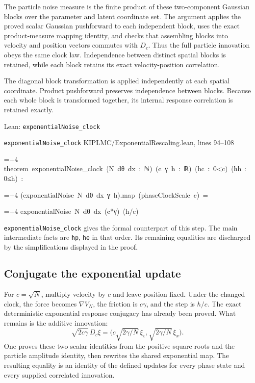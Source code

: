 \documentclass[11pt,a4paper]{report}
\newlength{\leancharwidth}
\newenvironment{leancode}{\par\smallskip\begingroup\ttfamily\footnotesize\raggedright
  \settowidth{\leancharwidth}{M}\setlength{\parskip}{0pt}\setlength{\parindent}{0pt}
  \frenchspacing}{\par\endgroup\smallskip}
\newcommand{\leanline}[2]{\hangindent=\dimexpr#1\leancharwidth+4\leancharwidth\relax
  \hangafter=1\noindent\hspace*{#1\leancharwidth}#2\par}
\newcommand{\leansource}[1]{\par{\footnotesize\color{leanmuted}#1}\par}
\newcommand{\leanlabel}[1]{\par\smallskip\noindent{\small\bfseries #1}\par}
\begin{document}
The particle noise measure is the finite product of these two-component Gaussian blocks over the parameter and latent coordinate set. The argument applies the proved scalar Gaussian pushforward to each independent block, uses the exact product-measure mapping identity, and checks that assembling blocks into velocity and position vectors commutes with \(D_c\). Thus the full particle innovation obeys the same clock law. Independence between distinct spatial blocks is retained, while each block retains its exact velocity-position correlation.



The diagonal block transformation is applied independently at each spatial coordinate. Product pushforward preserves independence between blocks. Because each whole block is transformed together, its internal response correlation is retained exactly.

\begin{leanbox}{Lean: \texttt{exponentialNoise\_\allowbreak{}clock}}
\leansource{\texttt{exponentialNoise\_\allowbreak{}clock} \quad KIPLMC/\allowbreak{}ExponentialRescaling.lean, lines 94–108}
\begin{leancode}
\leanline{0}{theorem\ exponentialNoise\_clock\ (N\ dθ\ dx\ :\ ℕ)\ (c\ γ\ h\ :\ ℝ)\ (hc\ :\ 0<c)\ (hh\ :\ 0≤h)\ :}
\leanline{4}{(exponentialNoise\ N\ dθ\ dx\ γ\ h).map\ (phaseClockScale\ c)\ =}
\leanline{6}{exponentialNoise\ N\ dθ\ dx\ (c*γ)\ (h/c)}
\end{leancode}
\leanlabel{How the Lean proof follows the argument}
\texttt{exponential\allowbreak{}Noise\_\allowbreak{}clock} gives the formal counterpart of this step. The main intermediate facts are \texttt{hp}, \texttt{he} in that order. Its remaining equalities are discharged by the simplifications displayed in the proof.
\end{leanbox}
\subsection{\texorpdfstring{Conjugate the exponential update}{Conjugate the exponential update}}
\label{report-step-KIPLMC-ExponentialRescaling-lean-4}


For \(c=\sqrt N\), multiply velocity by \(c\) and leave position fixed. Under the changed clock, the force becomes \(\nabla V_N\), the friction is \(c\gamma\), and the step is \(h/c\). The exact deterministic exponential response conjugacy has already been proved. What remains is the additive innovation: \[\sqrt{2c\gamma}\,D_c\xi=\bigl(c\sqrt{2\gamma/N}\,\xi_v,\sqrt{2\gamma/N}\,\xi_x\bigr).\] One proves these two scalar identities from the positive square roots and the particle amplitude identity, then rewrites the shared exponential map. The resulting equality is an identity of the defined updates for every phase state and every supplied correlated innovation.
\end{document}

